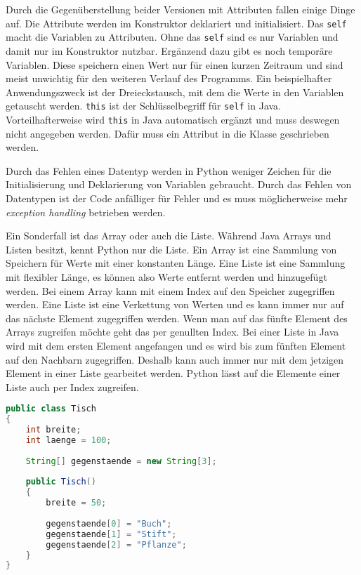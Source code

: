 Durch die Gegenüberstellung beider Versionen mit Attributen fallen einige Dinge auf. Die Attribute werden im Konstruktor deklariert und initialisiert. Das \texttt{self} macht die Variablen zu Attributen. Ohne das \texttt{self} sind es nur Variablen und damit nur im Konstruktor nutzbar. Ergänzend dazu gibt es noch temporäre Variablen. Diese speichern einen Wert nur für einen kurzen Zeitraum und sind meist unwichtig für den weiteren Verlauf des Programms. Ein beispielhafter Anwendungszweck ist der Dreieckstausch, mit dem die Werte in den Variablen getauscht werden. \texttt{this} ist der Schlüsselbegriff für \texttt{self} in Java. Vorteilhafterweise wird \texttt{this} in Java automatisch ergänzt und muss deswegen nicht angegeben werden. Dafür muss ein Attribut in die Klasse geschrieben werden. 
\par
Durch das Fehlen eines Datentyp werden in Python weniger Zeichen für die Initialisierung und Deklarierung von Variablen gebraucht. Durch das Fehlen von Datentypen ist der Code anfälliger für Fehler und es muss möglicherweise mehr \textit{exception handling} betrieben werden.
\par
Ein Sonderfall ist das Array oder auch die Liste. Während Java Arrays und Listen besitzt, kennt Python nur die Liste. Ein Array ist eine Sammlung von Speichern für Werte mit einer konstanten Länge. Eine Liste ist eine Sammlung mit flexibler Länge, es können also Werte entfernt werden und hinzugefügt werden. Bei einem Array kann mit einem Index auf den Speicher zugegriffen werden. Eine Liste ist eine Verkettung von Werten und es kann immer nur auf das nächste Element zugegriffen werden. Wenn man auf das fünfte Element des Arrays zugreifen möchte geht das per genullten Index. Bei einer Liste in Java wird mit dem ersten Element angefangen und es wird bis zum fünften Element auf den Nachbarn zugegriffen. Deshalb kann auch immer nur mit dem jetzigen Element in einer Liste gearbeitet werden. Python lässt auf die Elemente einer Liste auch per Index zugreifen. \cite{Louis:2010}\cite{Python3:Buch}

\begin{lstlisting}[language=java,caption={Array in Java},captionpos=b,label={lst:java:array},frame=none]
public class Tisch
{
    int breite;
    int laenge = 100;
  
    String[] gegenstaende = new String[3];
  
    public Tisch()
    {
        breite = 50;
    
        gegenstaende[0] = "Buch";
        gegenstaende[1] = "Stift";
        gegenstaende[2] = "Pflanze";
    }
}
\end{lstlisting}

